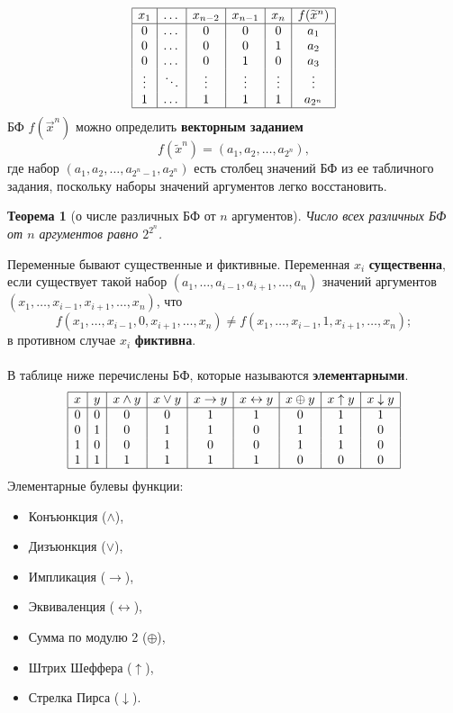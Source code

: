 \documentclass[a4paper, 12pt]{report}
\numberwithin{equation}{section}
\newtheorem*{theorem}{Теорема}
\begin{document}
	\[
	\begin{array}{|c|c|c|c|c|c|}
		\hline
		x_1 & \dots & x_{n-2} & x_{n-1} & x_n & f(\widetilde{x}^n) \\
		\hline
		0   & \dots & 0       & 0       & 0   & a_1 \\
		0   & \dots & 0       & 0       & 1   & a_2 \\
		0   & \dots & 0       & 1       & 0   & a_3 \\
		\vdots & \ddots & \vdots & \vdots & \vdots & \vdots \\
		1   & \dots & 1       & 1       & 1   & a_{2^n} \\
		\hline
	\end{array}
	\]
	БФ $f(\vec{x}^n)$ можно определить \textbf{векторным заданием}
	\[
	f(\widetilde{x}^n) = (a_1, a_2, \dots, a_{2^n}),
	\]
	где набор $(a_1, a_2, \dots,a_{2^n-1}, a_{2^n})$ есть столбец значений БФ из ее табличного задания, поскольку наборы значений аргументов легко восстановить.
	\begin{theorem}
		[о числе различных БФ от $n$ аргументов] Число всех различных БФ от $n$ аргументов равно $2^{2^n}$.
	\end{theorem}
	\noindent
	Переменные бывают существенные и фиктивные. Переменная $x_i$ \textbf{существенна}, если существует такой набор $(a_1,\ldots, a_{i-1}, a_{i+1},\ldots, a_n)$ значений аргументов $(x_1,\ldots, x_{i-1}, x_{i+1},\ldots, x_n)$, что	
	\[
	f(x_1, \dots, x_{i-1}, 0, x_{i+1}, \dots, x_n) \neq f(x_1, \dots, x_{i-1}, 1, x_{i+1}, \dots, x_n);
	\]
	в противном случае $x_i$ \textbf{фиктивна}.
	\\\\
	В таблице ниже перечислены БФ, которые называются \textbf{элементарными}.
	\[
	\begin{array}{|c|c|c|c|c|c|c|c|c|}
		\hline
		x & y & x \land y & x \lor y & x \to y & x \leftrightarrow y & x \oplus y & x \uparrow y & x \downarrow y \\
		\hline
		0 & 0 & 0 & 0 & 1 & 1 & 0 & 1 & 1 \\
		0 & 1 & 0 & 1 & 1 & 0 & 1 & 1 & 0 \\
		1 & 0 & 0 & 1 & 0 & 0 & 1 & 1 & 0 \\
		1 & 1 & 1 & 1 & 1 & 1 & 0 & 0 & 0 \\
		\hline
	\end{array}
	\]
	Элементарные булевы функции:
	\begin{itemize}
		\item Конъюнкция ($\land$),
		\item Дизъюнкция ($\lor$),
		\item Импликация ($\to$),
		\item Эквиваленция ($\leftrightarrow$),
		\item Сумма по модулю 2 ($\oplus$),
		\item Штрих Шеффера ($\uparrow$),
		\item Стрелка Пирса ($\downarrow$).
	\end{itemize}
\end{document}
